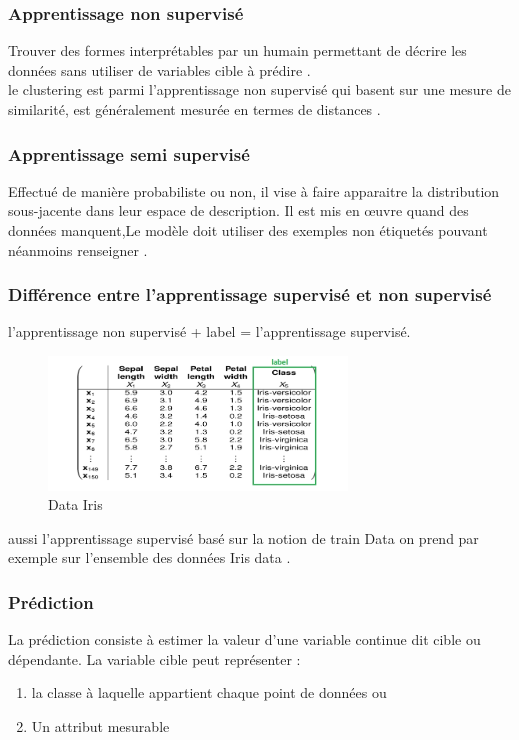 \documentclass[12pt]{report}
\begin{document}
\subsubsection{Apprentissage non supervisé}
Trouver des formes interprétables par un humain permettant de décrire les données sans utiliser de variables cible à prédire \cite{...} .
\\
 le clustering est parmi l'apprentissage non supervisé qui basent sur une mesure de similarité, est généralement mesurée en termes de distances \cite{ref11} .


\subsubsection{Apprentissage semi supervisé}
Effectué de manière probabiliste ou non, il vise à faire apparaitre la distribution sous-jacente dans leur espace de description. Il est mis en œuvre quand des données manquent,Le modèle doit utiliser des exemples non étiquetés pouvant néanmoins renseigner \cite{ref11} .
\subsubsection{Différence entre l'apprentissage supervisé et non supervisé }
l'apprentissage non supervisé + label = l'apprentissage supervisé.\\

\begin{figure}[h]
\begin{center}
\includegraphics[width=300]{iris.jpg} 
\caption{Data Iris}
\label{Data Iris}
\end{center}

\end{figure}

aussi l'apprentissage supervisé basé sur la notion de train Data on prend par exemple sur l'ensemble des données Iris data \cite{ref11} .


\subsubsection{Prédiction}
La prédiction consiste à estimer la valeur d'une variable continue dit cible ou dépendante.  La variable cible peut représenter :
\begin{enumerate}
\item la classe à laquelle appartient chaque point de données ou
\item Un attribut mesurable 
\end{enumerate}
\end{document}
